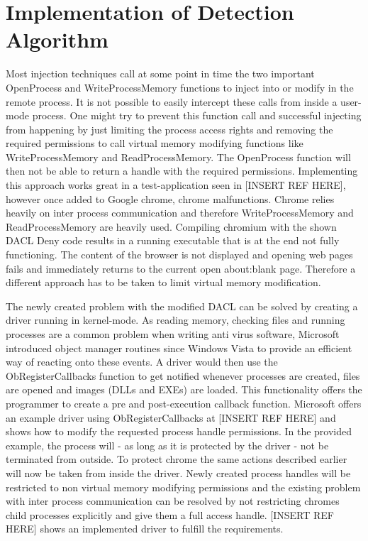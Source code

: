 \section{Implementation of Detection Algorithm}
\label{sec:implementation_dacl}
Most injection techniques call at some point in time the two important OpenProcess and WriteProcessMemory functions to inject into or modify in the remote process. It is not possible to easily intercept these calls from inside a user-mode process. One might try to prevent this function call and successful injecting from happening by just limiting the process access rights and removing the required permissions to call virtual memory modifying functions like WriteProcessMemory and ReadProcessMemory. The OpenProcess function will then not be able to return a handle with the required permissions. Implementing this approach works great in a test-application seen in [INSERT REF HERE], however once added to Google chrome, chrome malfunctions. Chrome relies heavily on inter process communication and therefore WriteProcessMemory and ReadProcessMemory are heavily used. Compiling chromium with the shown DACL Deny code results in a running executable that is at the end not fully functioning. The content of the browser is not displayed and opening web pages fails and immediately returns to the current open about:blank page. Therefore a different approach has to be taken to limit virtual memory modification.

The newly created problem with the modified DACL can be solved by creating a driver running in kernel-mode. As reading memory, checking files and running processes are a common problem when writing anti virus software, Microsoft introduced object manager routines since Windows Vista to provide an efficient way of reacting onto these events. A driver would then use the ObRegisterCallbacks function to get notified whenever processes are created, files are opened and images (DLLs and EXEs) are loaded. This functionality offers the programmer to create a pre and post-execution callback function. Microsoft offers an example driver using ObRegisterCallbacks at [INSERT REF HERE] and shows how to modify the requested process handle permissions. In the provided example, the process will - as long as it is protected by the driver - not be terminated from outside. To protect chrome the same actions described earlier will now be taken from inside the driver. Newly created process handles will be restricted to non virtual memory modifying permissions and the existing problem with inter process communication can be resolved by not restricting chromes child processes explicitly and give them a full access handle. [INSERT REF HERE] shows an implemented driver to fulfill the requirements. 